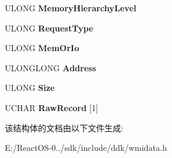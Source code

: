 \begin{DoxyCompactItemize}
U\+L\+O\+NG {\bfseries Memory\+Hierarchy\+Level}
\item 
\mbox{\label{struct___m_s_m_c_a_event___bus_error_ace17ed3532bd2e7145706dba5f2306df}} 
U\+L\+O\+NG {\bfseries Request\+Type}
\item 
\mbox{\label{struct___m_s_m_c_a_event___bus_error_a74ced7a4c989af4792e5d1863364f1cf}} 
U\+L\+O\+NG {\bfseries Mem\+Or\+Io}
\item 
\mbox{\label{struct___m_s_m_c_a_event___bus_error_aebebdf7377fe8f634c5c819adde68301}} 
U\+L\+O\+N\+G\+L\+O\+NG {\bfseries Address}
\item 
\mbox{\label{struct___m_s_m_c_a_event___bus_error_ab39a39034927c00cb392a4c5b51eb31d}} 
U\+L\+O\+NG {\bfseries Size}
\item 
\mbox{\label{struct___m_s_m_c_a_event___bus_error_aa5f749894ffef6fd422e434d3d5be1c1}} 
U\+C\+H\+AR {\bfseries Raw\+Record} \mbox{[}1\mbox{]}
\end{DoxyCompactItemize}


该结构体的文档由以下文件生成\+:\begin{DoxyCompactItemize}
\item 
E\+:/\+React\+O\+S-\/0../sdk/include/ddk/wmidata.\+h\end{DoxyCompactItemize}
